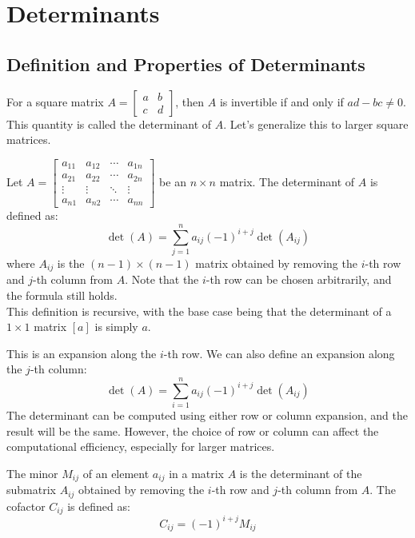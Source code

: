 \chapter{Determinants}

\section{Definition and Properties of Determinants}
For a square matrix \(A = \begin{bmatrix}
    a & b \\
    c & d
\end{bmatrix}\), then $A$ is invertible if and only if \(ad - bc \neq 0\). This quantity is called the determinant of $A$. Let's generalize this to larger square matrices.
\begin{definition}[Determinant]
    Let $A = \begin{bmatrix}
        a_{11} & a_{12} & \cdots & a_{1n} \\
        a_{21} & a_{22} & \cdots & a_{2n} \\
        \vdots & \vdots & \ddots & \vdots \\
        a_{n1} & a_{n2} & \cdots & a_{nn}
    \end{bmatrix}$ be an \(n \times n\) matrix. The determinant of $A$ is defined as:
    \[
        \det(A) = \sum_{j = 1}^{n} a_{ij} (-1)^{i+j} \det(A_{ij})
    \]
    where \(A_{ij}\) is the \((n-1) \times (n-1)\) matrix obtained by removing the \(i\)-th row and \(j\)-th column from $A$. Note that the $i$-th row can be chosen arbitrarily, and the formula still holds. \\ 
    This definition is recursive, with the base case being that the determinant of a \(1 \times 1\) matrix \([a]\) is simply \(a\).
\end{definition}
This is an expansion along the \(i\)-th row. We can also define an expansion along the \(j\)-th column:
\[
    \det(A) = \sum_{i = 1}^{n} a_{ij} (-1)^{i+j} \det(A_{ij})
\]
The determinant can be computed using either row or column expansion, and the result will be the same. However, the choice of row or column can affect the computational efficiency, especially for larger matrices.


\begin{definition}
    The minor \(M_{ij}\) of an element \(a_{ij}\) in a matrix $A$ is the determinant of the submatrix \(A_{ij}\) obtained by removing the \(i\)-th row and \(j\)-th column from $A$. The cofactor \(C_{ij}\) is defined as:
    \[
        C_{ij} = (-1)^{i+j} M_{ij}
    \]
\end{definition}

